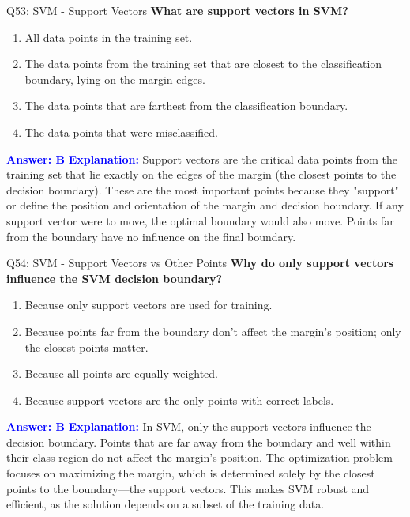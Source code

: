 \documentclass[8pt]{beamer}
\begin{document}
	\begin{frame}{Q53: SVM - Support Vectors}
		\fontsize{6.5}{7.5}\selectfont
		\textbf{What are support vectors in SVM?}
		\begin{enumerate}
			\item All data points in the training set.
			\item The data points from the training set that are closest to the classification boundary, lying on the margin edges.
			\item The data points that are farthest from the classification boundary.
			\item The data points that were misclassified.
		\end{enumerate}
		\vspace{0.1cm}
		\textcolor{blue}{\textbf{Answer: B}}
		\vspace{0.1cm}
		\textcolor{blue}{\textbf{Explanation:}} Support vectors are the critical data points from the training set that lie exactly on the edges of the margin (the closest points to the decision boundary). These are the most important points because they "support" or define the position and orientation of the margin and decision boundary. If any support vector were to move, the optimal boundary would also move. Points far from the boundary have no influence on the final boundary.
	\end{frame}
	
	\begin{frame}{Q54: SVM - Support Vectors vs Other Points}
		\fontsize{6.5}{7.5}\selectfont
		\textbf{Why do only support vectors influence the SVM decision boundary?}
		\begin{enumerate}
			\item Because only support vectors are used for training.
			\item Because points far from the boundary don't affect the margin's position; only the closest points matter.
			\item Because all points are equally weighted.
			\item Because support vectors are the only points with correct labels.
		\end{enumerate}
		\vspace{0.1cm}
		\textcolor{blue}{\textbf{Answer: B}}
		\vspace{0.1cm}
		\textcolor{blue}{\textbf{Explanation:}} In SVM, only the support vectors influence the decision boundary. Points that are far away from the boundary and well within their class region do not affect the margin's position. The optimization problem focuses on maximizing the margin, which is determined solely by the closest points to the boundary—the support vectors. This makes SVM robust and efficient, as the solution depends on a subset of the training data.
	\end{frame}
	
\end{document}
